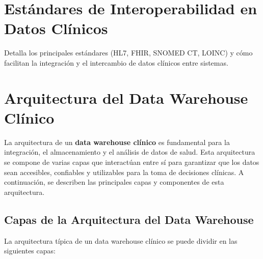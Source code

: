 \documentclass[12pt, a4paper, twoside]{article}
\begin{document}
	
	\section{Estándares de Interoperabilidad en Datos Clínicos}
	Detalla los principales estándares (HL7, FHIR, SNOMED CT, LOINC) y cómo facilitan la integración y el intercambio de datos clínicos entre sistemas.
	
	\section{Arquitectura del Data Warehouse Clínico}
	
	La arquitectura de un \textbf{data warehouse clínico} es fundamental para la integración, el almacenamiento y el análisis de datos de salud. Esta arquitectura se compone de varias capas que interactúan entre sí para garantizar que los datos sean accesibles, confiables y utilizables para la toma de decisiones clínicas. A continuación, se describen las principales capas y componentes de esta arquitectura.
	
	\subsection{Capas de la Arquitectura del Data Warehouse}
	
	La arquitectura típica de un data warehouse clínico se puede dividir en las siguientes capas:
	
\end{document}
